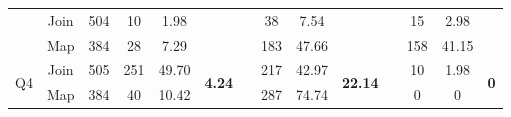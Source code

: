 \begin{table}
\begin{tabular}{cccccccccccccc}
                                & Join                                & 504                             & 10                                                                      & 1.98                                                                       &                                 &           & 38                                                                      & 7.54                                                                       &                                 &           & 15                                                                      & 2.98                                                                       &                                 \\
                                & Map                                 & 384                             & 28                                                                      & 7.29                                                                       &                                 &           & 183                                                                     & 47.66                                                                      &                                 &           & 158                                                                     & 41.15                                                                      &                                 \\ \hline
\multirow{3}{*}{Q4}             & Join                                & 505                             & 251                                                                     & 49.70                                                                      & \multirow{3}{*}{\textbf{4.24}}  &           & 217                                                                     & 42.97                                                                      & \multirow{3}{*}{\textbf{22.14}} &           & 10                                                                      & 1.98                                                                       & \multirow{3}{*}{\textbf{0}}     \\
                                & Map                                 & 384                             & 40                                                                      & 10.42                                                                      &                                 &           & 287                                                                     & 74.74                                                                      &                                 &           & 0                                                                       & 0                                                                          &                                 \\

\end{tabular}
\end{table}
